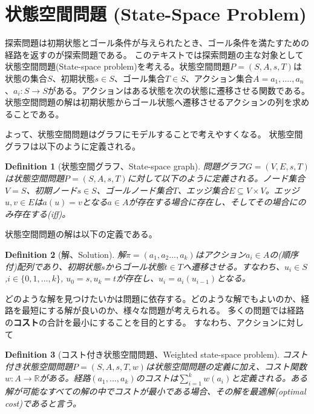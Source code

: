 \documentclass{report}
\newtheorem{definition}{Definition}
\begin{document}
\section{状態空間問題 (State-Space Problem)}
\label{sec:state-space-problem}
探索問題は初期状態とゴール条件が与えられたとき、ゴール条件を満たすための経路を返すのが探索問題である。
このテキストでは探索問題の主な対象として状態空間問題(State-space problem)を考える。状態空間問題$P = (S, A, s, T)$は状態の集合$S$、初期状態$s \in S$、ゴール集合$T \in S$、アクション集合$A = {a_1, ....,a_n}$、$a_i : S \rightarrow S$がある。アクションはある状態を次の状態に遷移させる関数である。
状態空間問題の解は初期状態からゴール状態へ遷移させるアクションの列を求めることである。

よって、状態空間問題はグラフにモデルすることで考えやすくなる。
状態空間グラフは以下のように定義される。

\begin{definition}[状態空間グラフ、State-space graph]
問題グラフ$G = (V, E, s, T)$は状態空間問題$P = (S, A, s, T)$に対して以下のように定義される。ノード集合 $V = S$、初期ノード$s \in S$、ゴールノード集合$T$、エッジ集合$E\subseteq V \times V$。エッジ$u,v\in E$は$a(u) = v$となる$a\in A$が存在する場合に存在し、そしてその場合にのみ存在する(iff)。
\end{definition}

状態空間問題の解は以下の定義である。

\begin{definition}[解、Solution]
解$\pi = (a_1,a_2...,a_k)$はアクション$a_i \in A$の(順序付)配列であり、初期状態$s$からゴール状態$t \in T$へ遷移させる。すなわち、$u_i \in S$,$i \in \{0,1,...,k\}$, $u_0 = s, u_k = t$が存在し、$u_i = a_i(u_{i-1})$となる。
\end{definition}

どのような解を見つけたいかは問題に依存する。どのような解でもよいのか、経路を最短にする解が良いのか、様々な問題が考えられる。
多くの問題では経路の{\bf コスト}の合計を最小にすることを目的とする。
すなわち、アクションに対して

\begin{definition}[コスト付き状態空間問題、Weighted state-space problem]
コスト付き状態空間問題$P = (S, A, s, T, w)$は状態空間問題の定義に加え、コスト関数$w: A \rightarrow \mathbb{R}$がある。経路$(a_1,...,a_k)$のコストは$\sum^k_{i=1}w(a_i)$と定義される。ある解が可能なすべての解の中でコストが最小である場合、その解を最適解(optimal cost)であると言う。
\end{definition}
\end{document}
